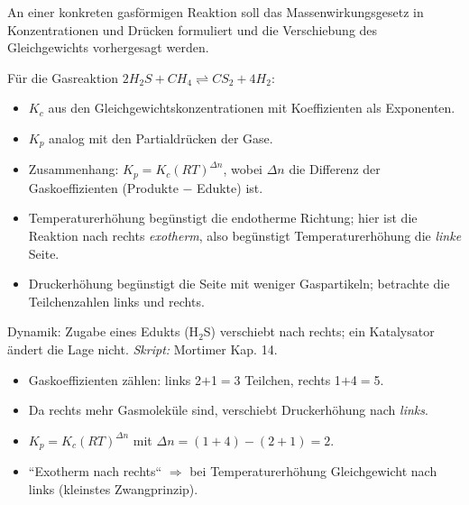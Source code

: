 

An einer konkreten gasförmigen Reaktion soll das Massenwirkungsgesetz in
Konzentrationen und Drücken formuliert und die Verschiebung des
Gleichgewichts vorhergesagt werden.

\begin{werkzeugkasten}
Für die Gasreaktion $2H_2S + CH_4 \rightleftharpoons CS_2 + 4H_2$:
\begin{itemize}
  \item $K_c$ aus den Gleichgewichtskonzentrationen mit Koeffizienten als
        Exponenten.
  \item $K_p$ analog mit den Partialdrücken der Gase.
  \item Zusammenhang: $K_p = K_c(RT)^{\Delta n}$, wobei $\Delta n$ die
        Differenz der Gaskoeffizienten (Produkte $-$ Edukte) ist.
  \item Temperaturerhöhung begünstigt die endotherme Richtung; hier ist die
        Reaktion nach rechts \emph{exotherm}, also begünstigt
        Temperaturerhöhung die \emph{linke} Seite.
  \item Druckerhöhung begünstigt die Seite mit weniger Gaspartikeln;
        betrachte die Teilchenzahlen links und rechts.
\end{itemize}
Dynamik: Zugabe eines Edukts (H$_2$S) verschiebt nach rechts; ein
Katalysator ändert die Lage nicht.
\textit{Skript:} Mortimer Kap. 14.
\end{werkzeugkasten}

\begin{achtung}
\begin{itemize}
  \item Gaskoeffizienten zählen: links 2$+$1$=$3 Teilchen, rechts 1$+$4$=$5.
  \item Da rechts mehr Gasmoleküle sind, verschiebt Druckerhöhung nach
        \emph{links}.
  \item $K_p = K_c(RT)^{\Delta n}$ mit $\Delta n = (1+4)-(2+1) = 2$.
  \item ``Exotherm nach rechts`` $\Rightarrow$ bei Temperaturerhöhung
        Gleichgewicht nach links (kleinstes Zwangprinzip).
\end{itemize}
\end{achtung}
